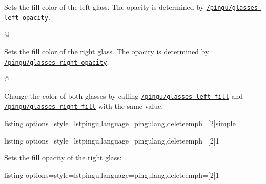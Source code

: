\documentclass[parskip=half,english,numbers=noenddot,footnotes=nomultiple,oneside]{scrartcl}
\def\lpingu#1{\lstinline[style=lstpingu,language=pingulang]'#1'}
\newcommand*\keyref[2][/pingu/]{\hyperref[pk:#1#2]{\lpingu{#1#2}}}
\begin{document}
	Sets the fill color of the left glass. The opacity is determined by \keyref{glasses left opacity}.
\begin{tcblisting}{@}
\begin{tikzpicture}
	\pingu[glasses,
	       glasses left fill=green]
\end{tikzpicture}
\end{tcblisting}
\endsubkeyexplain

	Sets the fill color of the right glass. The opacity is determined by \keyref{glasses right opacity}.
\begin{tcblisting}{@}
\begin{tikzpicture}
	\pingu[glasses,
	       glasses right fill=green]
\end{tikzpicture}
\end{tcblisting}
\endsubkeyexplain

	Change the color of both glasses by calling \keyref{glasses left fill} and \keyref{glasses right fill} with the same value.
\begin{tcblisting}{listing options={style=lstpingu,language=pingulang,deleteemph={[2]{simple}}}}
\begin{tikzpicture}
	\pingu[glasses, glasses fill=green]
\end{tikzpicture}
\end{tcblisting}
\endsubkeyexplain

\begin{tcblisting}{listing options={style=lstpingu,language=pingulang,deleteemph={[2]{1}}}}
\begin{tikzpicture}
	\pingu[glasses,
	       glasses left fill=green,
				 glasses left opacity=1]
\end{tikzpicture}
\end{tcblisting}
\endsubkeyexplain

	Sets the fill opacity of the right glass:
\begin{tcblisting}{listing options={style=lstpingu,language=pingulang,deleteemph={[2]{1}}}}
\begin{tikzpicture}
	\pingu[glasses,
	       glasses right fill=green,
				 glasses right opacity=1]
\end{tikzpicture}
\end{tcblisting}
\endsubkeyexplain
\end{document}

